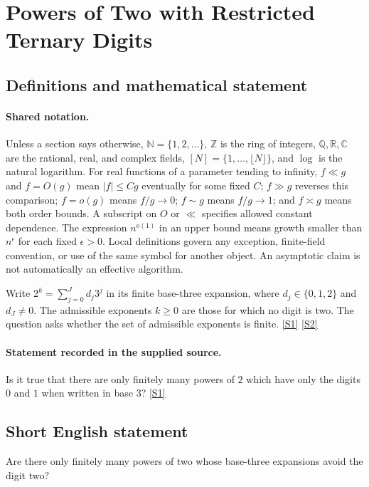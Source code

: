\documentclass[11pt,a4paper]{article}
\newcommand{\N}{\mathbb{N}}
\newcommand{\Z}{\mathbb{Z}}
\newcommand{\Q}{\mathbb{Q}}
\newcommand{\R}{\mathbb{R}}
\newcommand{\C}{\mathbb{C}}
\newcommand{\sref}[2]{\hyperlink{source:#1:#2}{[S#2]}}
\begin{document}
\section{Powers of Two with Restricted Ternary Digits}\label{statement}


\subsection{Definitions and mathematical statement}

\paragraph{Shared notation.}Unless a section says otherwise, $\N=\{1,2,\ldots\}$,
$\Z$ is the ring of integers, $\Q,\R,\C$ are the rational, real, and complex
fields, $[N]=\{1,\ldots,\lfloor N\rfloor\}$, and $\log$ is the natural
logarithm. For real functions of a parameter tending to infinity,
$f\ll g$ and $f=O(g)$ mean $|f|\leq Cg$ eventually for some fixed $C$;
$f\gg g$ reverses this comparison; $f=o(g)$ means $f/g\to0$;
$f\sim g$ means $f/g\to1$; and $f\asymp g$ means both order bounds.
A subscript on $O$ or $\ll$ specifies allowed constant dependence.
The expression $n^{o(1)}$ in an upper bound means growth smaller than
$n^\epsilon$ for each fixed $\epsilon>0$. Local definitions govern any
exception, finite-field convention, or use of the same symbol for another
object. An asymptotic claim is not automatically an effective algorithm.



Write $2^k=\sum_{j=0}^{J}d_j3^j$ in its finite base-three expansion, where $d_j\in\{0,1,2\}$ and $d_J\ne0$. The admissible exponents $k\geq0$ are those for which no digit is two. The question asks whether the set of admissible exponents is finite. \sref{statement}{1} \sref{statement}{2}

\paragraph{Statement recorded in the supplied source.}
Is it true that there are only finitely many powers of $2$ which have only the digits $0$ and $1$ when written in base $3$? \sref{statement}{1}

\subsection{Short English statement}

Are there only finitely many powers of two whose base-three expansions avoid the digit two?
\end{document}
